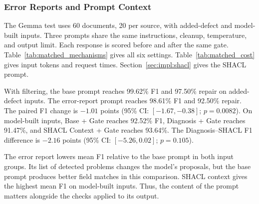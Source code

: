 \subsubsection{Error Reports and Prompt Context}

The Gemma test uses 60 documents, 20 per source, with added-defect and
model-built inputs. Three prompts share the same instructions, cleanup,
temperature, and output limit. Each response is scored before and after
the same gate. Table~\ref{tab:matched_mechanisms} gives all six settings.
Table~\ref{tab:matched_cost} gives input tokens and request times.
Section~\ref{sec:impl:shacl} gives the SHACL prompt.

\begin{table}[t]
\centering
\caption{Gemma prompt tests on 60 documents per input group. Each raw/gated pair uses the same response.}
\label{tab:matched_mechanisms}
\small
{}
\end{table}

With filtering, the base prompt reaches 99.62\% F1 and 97.50\% repair on
added-defect inputs. The error-report prompt reaches 98.61\% F1 and 92.50\%
repair. The paired F1 change is $-1.01$ points
(95\% CI: $[-1.67,-0.38]$; $p=0.0082$).
On model-built inputs, Base + Gate reaches 92.52\% F1,
Diagnosis + Gate reaches 91.47\%, and SHACL Context + Gate reaches 93.64\%.
The Diagnosis--SHACL F1 difference is $-2.16$ points
(95\% CI: $[-5.26,0.02]$; $p=0.105$).

The error report lowers mean F1 relative to the base prompt in both
input groups. Its list of detected problems changes the model's proposals,
but the base prompt produces better field matches in this comparison.
SHACL context gives the highest mean F1 on model-built inputs.
Thus, the content of the prompt matters alongside the checks applied
to its output.

